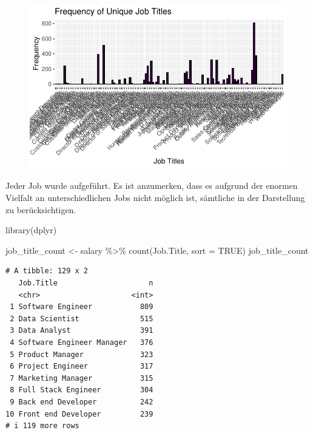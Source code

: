 \documentclass[
  letterpaper,
  DIV=11,
  numbers=noendperiod]{scrartcl}
\newenvironment{Shaded}{\begin{snugshade}}{\end{snugshade}}
\newcommand{\AttributeTok}[1]{\textcolor[rgb]{0.40,0.45,0.13}{#1}}
\newcommand{\ConstantTok}[1]{\textcolor[rgb]{0.56,0.35,0.01}{#1}}
\newcommand{\FunctionTok}[1]{\textcolor[rgb]{0.28,0.35,0.67}{#1}}
\newcommand{\NormalTok}[1]{\textcolor[rgb]{0.00,0.23,0.31}{#1}}
\newcommand{\OtherTok}[1]{\textcolor[rgb]{0.00,0.23,0.31}{#1}}
\newcommand{\SpecialCharTok}[1]{\textcolor[rgb]{0.37,0.37,0.37}{#1}}
\newcommand{\StringTok}[1]{\textcolor[rgb]{0.13,0.47,0.30}{#1}}
\begin{document}
\begin{figure}[H]

{\centering \includegraphics{main_doc_files/figure-pdf/unnamed-chunk-37-1.pdf}

}

\end{figure}

Jeder Job wurde aufgeführt. Es ist anzumerken, dass es aufgrund der
enormen Vielfalt an unterschiedlichen Jobs nicht möglich ist, sämtliche
in der Darstellung zu berücksichtigen.

\begin{Shaded}
\begin{Highlighting}[]
\FunctionTok{library}\NormalTok{(dplyr)}

\NormalTok{job\_title\_count }\OtherTok{\textless{}{-}}\NormalTok{ salary }\SpecialCharTok{\%\textgreater{}\%}
  \FunctionTok{count}\NormalTok{(}\StringTok{\textasciigrave{}}\AttributeTok{Job.Title}\StringTok{\textasciigrave{}}\NormalTok{, }\AttributeTok{sort =} \ConstantTok{TRUE}\NormalTok{)}
\NormalTok{job\_title\_count}
\end{Highlighting}
\end{Shaded}

\begin{verbatim}
# A tibble: 129 x 2
   Job.Title                     n
   <chr>                     <int>
 1 Software Engineer           809
 2 Data Scientist              515
 3 Data Analyst                391
 4 Software Engineer Manager   376
 5 Product Manager             323
 6 Project Engineer            317
 7 Marketing Manager           315
 8 Full Stack Engineer         304
 9 Back end Developer          242
10 Front end Developer         239
# i 119 more rows
\end{verbatim}
\end{document}
